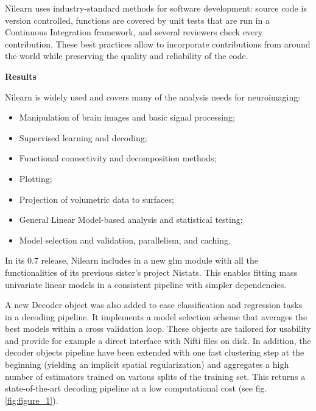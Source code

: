 \documentclass[a4paper]{article}
\begin{document}
\medskip

\noindent Nilearn uses industry-standard methods for software development: source code is version controlled, functions are covered by unit tests that are run in a Continuous Integration framework, and several reviewers check every contribution. These best practices allow to incorporate contributions from around the world while preserving the quality and reliability of the code.

\bigskip

\noindent \textbf{Results}

\medskip

\noindent Nilearn is widely used and covers many of the analysis needs for neuroimaging:

\begin{itemize}
	\item Manipulation of brain images and basic signal processing;
	\item Supervised learning and decoding;
	\item Functional connectivity and decomposition methods;
	\item Plotting;
	\item Projection of volumetric data to surfaces;
	\item General Linear Model-based analysis and statistical testing;
	\item Model selection and validation, parallelism, and caching.
\end{itemize}

\noindent In its 0.7 release, Nilearn includes in a new glm module with all the functionalities of its previous sister’s project Nistats. This enables fitting mass univariate linear models in a consistent pipeline with simpler dependencies.

\medskip

\noindent A new Decoder object was also added to ease classification and regression tasks in a decoding pipeline. It implements a model selection scheme that averages the best models within a cross validation loop. These objects are tailored for usability and provide for example a direct interface with Nifti files on disk. In addition, the decoder objects pipeline have been extended with one fast clustering step at the beginning (yielding an implicit spatial regularization) and aggregates a high number of estimators trained on various splits of the training set. This returns a state-of-the-art decoding pipeline at a low computational cost (see fig. \ref{fig:figure_1}).
\end{document}
